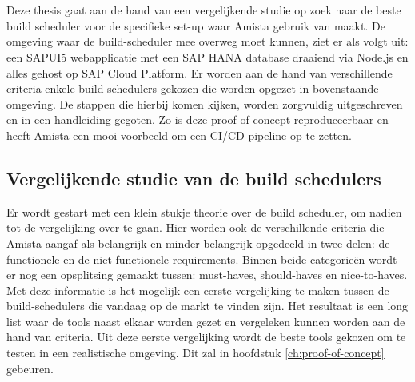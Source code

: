 
\chapter{}
\label{ch:methodologie}

Deze thesis gaat aan de hand van een vergelijkende studie op zoek naar de beste build scheduler voor de specifieke set-up waar Amista gebruik van maakt. De omgeving waar de build-scheduler mee overweg moet kunnen, ziet er als volgt uit: een SAPUI5 webapplicatie met een SAP HANA database draaiend via Node.js en alles gehost op SAP Cloud Platform. Er worden aan de hand van verschillende criteria enkele build-schedulers gekozen die worden opgezet in bovenstaande omgeving. De stappen die hierbij komen kijken, worden zorgvuldig uitgeschreven en in een handleiding gegoten. Zo is deze proof-of-concept reproduceerbaar en heeft Amista een mooi voorbeeld om een CI/CD pipeline op te zetten.

    \section{Vergelijkende studie van de build schedulers}
    Er wordt gestart met een klein stukje theorie over de build scheduler, om nadien tot de vergelijking over te gaan. Hier worden ook de verschillende criteria die Amista aangaf als belangrijk en minder belangrijk opgedeeld in twee delen: de functionele en de niet-functionele requirements. Binnen beide categorieën wordt er nog een opsplitsing gemaakt tussen: must-haves, should-haves en nice-to-haves.
    Met deze informatie is het mogelijk een eerste vergelijking te maken tussen de build-schedulers die vandaag op de markt te vinden zijn. Het resultaat is een long list waar de tools naast elkaar worden gezet en vergeleken kunnen worden aan de hand van criteria. 
    Uit deze eerste vergelijking wordt de beste tools gekozen om te testen in een realistische omgeving. Dit zal in hoofdstuk \ref{ch:proof-of-concept} gebeuren.

